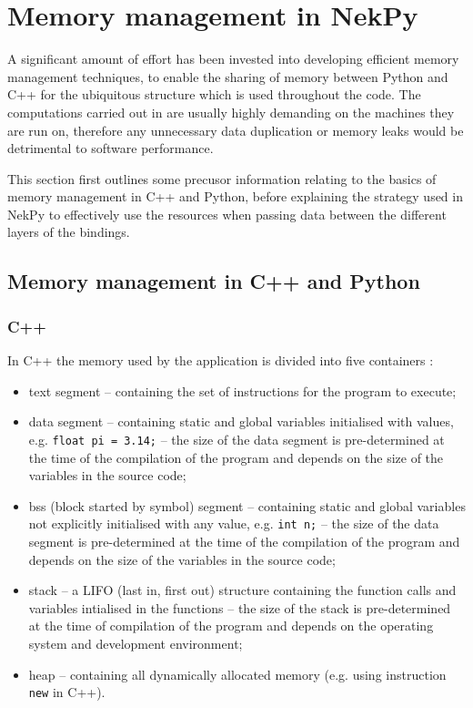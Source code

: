 \chapter{Memory management in NekPy}
\label{sec:nekpy:memory}

A significant amount of effort has been invested into developing efficient
memory management techniques, to enable the sharing of memory between Python and
C++ for the ubiquitous \nek{}  structure which is used throughout
the code.  The computations carried out in \nek{} are usually highly demanding
on the machines they are run on, therefore any unnecessary data duplication or
memory leaks would be detrimental to software performance.

This section first outlines some precusor information relating to the basics of
memory management in C++ and Python, before explaining the strategy used in
NekPy to effectively use the resources when passing data between the different
layers of the bindings.

\section{Memory management in C++ and Python}

\subsection{C++}

In C++ the memory used by the application is divided into five containers \cite{C++Memory}:
\begin{itemize}
    \item text segment -- containing the set of instructions for the program to execute;
    \item data segment -- containing static and global variables initialised with values, 
    e.g. \texttt{float pi = 3.14;} -- the size of the data segment is pre-determined at 
    the time of the compilation of the program and depends on the size of the variables 
    in the source code;
    \item bss (block started by symbol) segment -- containing static and global variables 
    not explicitly initialised with any value, e.g. \texttt{int n;} -- the size of the 
    data segment is pre-determined at the time of the compilation of the program and 
    depends on the size of the variables in the source code;
    \item stack -- a LIFO (last in, first out) structure containing the function calls 
    and variables intialised in the functions -- the size of the stack is pre-determined 
    at the time of compilation of the program and depends on the operating system and 
    development environment;
    \item heap -- containing all dynamically allocated memory (e.g. using instruction 
    \texttt{new} in C++).
\end{itemize}

